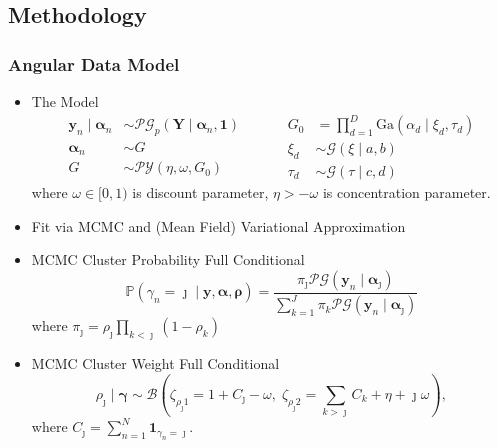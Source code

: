 \documentclass[aspectratio=169,10pt,notes]{beamer}
\begin{document}
\note{
    \begin{itemize}
        \item
    \end{itemize}
}

\subsection{Methodology}

\begin{frame}
    \frametitle{Angular Data Model}
    {\small 
    \begin{itemize}
        \item The Model
        \[
        \begin{aligned}
                \bm{y}_n \mid \bm{\alpha}_n &\sim
                    \mathcal{PG}_p\left(\bm{Y}\mid\bm{\alpha}_n,\bm{1}\right)\\
                \bm{\alpha}_n &\sim G\\
                G &\sim \mathcal{PY}\left(\eta, \omega, G_0\right)        
            \end{aligned}
            ~\hspace{1cm}
            \begin{aligned}
                G_0 &= {\textstyle\prod}_{d = 1}^{D}
                    \text{Ga}(\alpha_{d}\mid \xi_{d},\tau_{d})\\
                \xi_{d} &\sim \mathcal{G}(\xi\mid a, b)\\
                \tau_{d} &\sim \mathcal{G}(\tau\mid c, d)
            \end{aligned}
        \]
        where $\omega \in [0,1)$ is discount parameter, $\eta > -\omega$ is concentration parameter.
    \item Fit via MCMC and (Mean Field) Variational Approximation
    \item MCMC Cluster Probability Full Conditional
        \[
        \mathbb{P}\left(\gamma_n = \jmath\mid \bm{y},\bm{\alpha},\bm{\rho}\right) = 
            \frac{\pi_\jmath\mathcal{PG}(\bm{y}_n\mid\bm{\alpha}_{\jmath})}{
                \sum_{k = 1}^J \pi_k\mathcal{PG}(\bm{y}_n\mid\bm{\alpha}_{\jmath})}
        \]
        where $\pi_{\jmath} = \rho_{\jmath}\prod_{k < \jmath}(1 - \rho_k)$
        \item MCMC Cluster Weight Full Conditional
        \[
        \rho_{\jmath}\mid\bm{\gamma} \sim 
            \mathcal{B}\left(\zeta_{\rho_\jmath 1} = 1 + C_{\jmath} - \omega,\; 
            \zeta_{\rho_{\jmath} 2} = {\textstyle \sum}_{k>\jmath} 
                C_k + \eta + \jmath \omega\right),
        \]
        where $C_\jmath = \sum_{n = 1}^N\bm{1}_{\gamma_n = \jmath}$.
    \end{itemize}
    }
\end{frame} %
\end{document}
